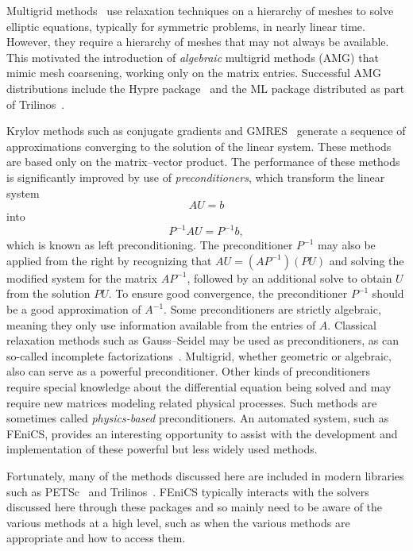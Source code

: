 Multigrid methods~\citep{Brandt1977,Wesseling1992} use relaxation
techniques on a hierarchy of meshes to solve elliptic equations,
typically for symmetric problems, in nearly linear time. However, they
require a hierarchy of meshes that may not always be available.  This
motivated the introduction of \emph{algebraic} multigrid methods (AMG)
that mimic mesh coarsening, working only on the matrix entries.
Successful AMG distributions include the Hypre
package~\citep{FalgoutYang2002} and the ML package distributed as part
of Trilinos~\citep{HerouxBartlettHowleEtAl2005}.

%
Krylov methods such as conjugate gradients and
GMRES~\citep{SaadSchultz1986} generate a sequence of approximations
converging to the solution of the linear system. These methods are
based only on the matrix--vector product.  The performance of these
methods is significantly improved by use of \emph{preconditioners},
which transform the linear system
\begin{equation}
AU = b
\end{equation}
into
\begin{equation}
P^{-1} A U = P^{-1} b,
\end{equation}
which is known as left preconditioning. The preconditioner $P^{-1}$
may also be applied from the right by recognizing that $A U = (A
P^{-1}) (P U)$ and solving the modified system for the matrix $A
P^{-1}$, followed by an additional solve to obtain $U$ from the
solution $PU$. To ensure good convergence, the preconditioner $P^{-1}$
should be a good approximation of $A^{-1}$. Some preconditioners are
strictly algebraic, meaning they only use information available from
the entries of \( A \). Classical relaxation methods such as
Gauss--Seidel may be used as preconditioners, as can so-called
incomplete
factorizations~\citep{Manteuffel1980,Axelsson1986,Saad1994}. Multigrid,
whether geometric or algebraic, also can serve as a powerful
preconditioner. Other kinds of preconditioners require special
knowledge about the differential equation being solved and may require
new matrices modeling related physical processes.  Such methods are
sometimes called \emph{physics-based} preconditioners. An automated
system, such as FEniCS, provides an interesting opportunity to assist
with the development and implementation of these powerful but less
widely used methods.

Fortunately, many of the methods discussed here are included in modern
libraries such as PETSc~\citep{BalayBuschelmanEijkhoutEtAl2004} and
Trilinos~\citep{HerouxBartlettHowleEtAl2005}. FEniCS typically
interacts with the solvers discussed here through these packages and
so mainly need to be aware of the various methods at a high level,
such as when the various methods are appropriate and how to access
them.

